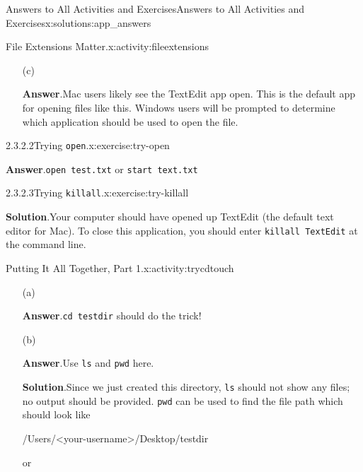 \documentclass[oneside,10pt,]{book}
\newcommand{\blocktitlefont}{\relax}
\newcommand{\mono}[1]{\texttt{#1}}
\begin{document}
\begin{solutions-chapter}{Answers to All Activities and Exercises}{}{Answers to All Activities and Exercises}{}{}{x:solutions:app_answers}
\begin{activitysolution}{2.1}{File Extensions Matter.}{x:activity:fileextensions}
\begin{enumerate}[font=\bfseries,label=(\alph*),ref=\alph*]
\item[(c)]\par\smallskip%
\noindent\textbf{\blocktitlefont Answer}.\hypertarget{g:answer:idp615455768-back}{}\quad{}Mac users likely see the TextEdit app open. This is the default app for opening files like this. Windows users will be prompted to determine which application should be used to open the file.%
\end{enumerate}
\end{activitysolution}%
\begin{inlinesolution}{2.3.2.2}{Trying \mono{open}.}{x:exercise:try-open}%
\par\smallskip%
\noindent\textbf{\blocktitlefont Answer}.\hypertarget{g:answer:idp615475736-back}{}\quad{}\mono{open test.txt} or \mono{start text.txt}%
\end{inlinesolution}%
\begin{inlinesolution}{2.3.2.3}{Trying \mono{killall}.}{x:exercise:try-killall}%
\par\smallskip%
\noindent\textbf{\blocktitlefont Solution}.\hypertarget{g:solution:idp615479704-back}{}\quad{}Your computer should have opened up TextEdit (the default text editor for Mac). To close this application, you should enter \mono{killall TextEdit} at the command line.%
\end{inlinesolution}%
\begin{activitysolution}{2.2}{Putting It All Together, Part 1.}{x:activity:trycdtouch}%
\begin{enumerate}[font=\bfseries,label=(\alph*),ref=\alph*]
\item[(a)]\par\smallskip%
\noindent\textbf{\blocktitlefont Answer}.\hypertarget{g:answer:idp615499544-back}{}\quad{}\mono{cd testdir} should do the trick!%
\item[(b)]\par\smallskip%
\noindent\textbf{\blocktitlefont Answer}.\hypertarget{g:answer:idp615500952-back}{}\quad{}Use \mono{ls} and \mono{pwd} here.%
\par\smallskip%
\noindent\textbf{\blocktitlefont Solution}.\hypertarget{g:solution:idp615500312-back}{}\quad{}Since we just created this directory, \mono{ls} should not show any files; no output should be provided. \mono{pwd} can be used to find the file path which should look like%
\begin{codedisplay}
/Users/<your-username>/Desktop/testdir
\end{codedisplay}
or%
\begin{codedisplay}

\end{codedisplay}
\end{enumerate}
\end{activitysolution}
\end{solutions-chapter}
\end{document}
